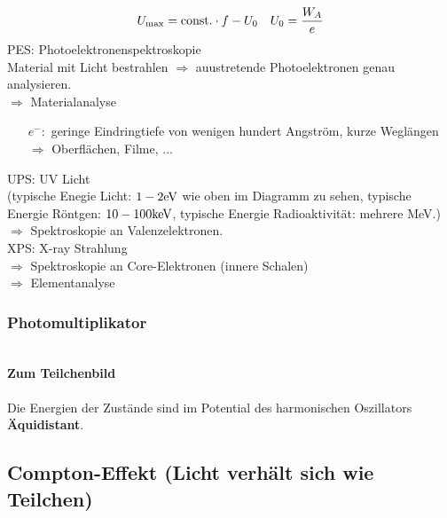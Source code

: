 
\begin{equation*}
U_{\textrm{max}} = \textrm{const.} \cdot f - U_0 \quad U_0 = \frac{W_A}{e}
\end{equation*}
PES: Photoelektronenspektroskopie\\[5pt]
Material mit Licht bestrahlen $ \Rightarrow $ auustretende Photoelektronen genau analysieren.\\
$ \Rightarrow $ Materialanalyse
\begin{itemize}
	\item[$ e^-: $] geringe Eindringtiefe von wenigen hundert Angström, kurze Weglängen $ \Rightarrow $ Oberflächen, Filme, ...
\end{itemize}
UPS: UV Licht\\
(typische Enegie Licht: $ 1-2 \textrm{eV} $ wie oben im Diagramm zu sehen,
typische Energie Röntgen: $ 10-100 \textrm{keV} $,
typische Energie Radioaktivität: mehrere MeV.)\\
$ \Rightarrow $ Spektroskopie an Valenzelektronen.\\[5pt]
XPS: X-ray Strahlung\\
$ \Rightarrow $ Spektroskopie an Core-Elektronen (innere Schalen)\\
$ \Rightarrow $ Elementanalyse\\

\subsubsection{Photomultiplikator}

\\
\textbf{Zum Teilchenbild}\\
\\
Die Energien der Zustände sind im Potential des harmonischen Oszillators \textbf{Äquidistant}.

\subsection{Compton-Effekt (Licht verhält sich wie Teilchen)}


